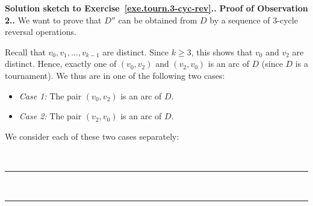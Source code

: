 \documentclass[numbers=enddot,12pt,final,onecolumn,notitlepage]{scrartcl}%
\theoremstyle{definition}
\newenvironment{proof}[1][Proof]{\noindent\textbf{#1.} }{\ \rule{0.5em}{0.5em}}
\newcommand{\tup}[1]{\left( #1 \right)}
\begin{document}
\begin{proof}[Solution sketch to Exercise~\ref{exe.tourn.3-cyc-rev}.]
\begin{proof}[Proof of Observation 2.]
We want to prove that $D''$ can be obtained from $D$ by a sequence of
$3$-cycle reversal operations.


Recall that $v_0, v_1, \ldots, v_{k-1}$ are distinct. Since
$k \geq 3$, this shows that $v_0$ and $v_2$ are distinct. Hence,
exactly one of $\tup{v_0, v_2}$ and $\tup{v_2, v_0}$ is an arc of $D$
(since $D$ is a tournament). We thus are in one of the following two
cases:

\begin{itemize}
\item \textit{Case 1:} The pair $\tup{v_0, v_2}$ is an arc of $D$.
\item \textit{Case 2:} The pair $\tup{v_2, v_0}$ is an arc of $D$.
\end{itemize}

We consider each of these two cases separately:


\end{proof}
\end{proof}
\end{document}
